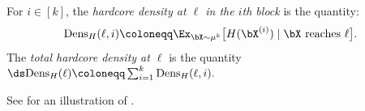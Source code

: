 \documentclass[11pt]{article}
\newcommand{\Dens}{\mathrm{Dens}}
\begin{document}
\begin{definition}
\label{def:hardcore-density}
For $i\in [k]$, the {\sl hardcore density at $\ell$ in the $i$th block} is the quantity: 
\[ \Dens_H(\ell,i)\coloneqq \Ex_{\bX\sim \mu^k}\big[H(\bX^{(i)})\mid \text{$\bX$ reaches $\ell$}\big]. \]
The {\sl total hardcore density at $\ell$} is the quantity $\ds \Dens_H(\ell) \coloneqq \sum_{i =1}^k \Dens_H(\ell,i).$
\end{definition}

See  for an illustration of .


\def\centerarc[#1](#2)(#3:#4:#5){ \draw[#1] ($(#2)+({#5*cos(#3)},{#5*sin(#3)})$) arc (#3:#4:#5); }


\newcommand{\quartercirc}{%
\begin{tikzpicture}
    \centerarc[black,fill=gray!30](0,0)(0:90:0.24) %
    \filldraw[fill=gray!30,opacity=0.0,fill opacity=1] (0,0) -- (0,0.24) -- (0.24,0) -- cycle;
    \draw[-] (0,0) to (0,0.24);
    \draw[-] (0,0) to (0.24,0);
\end{tikzpicture}%
}
\end{document}
